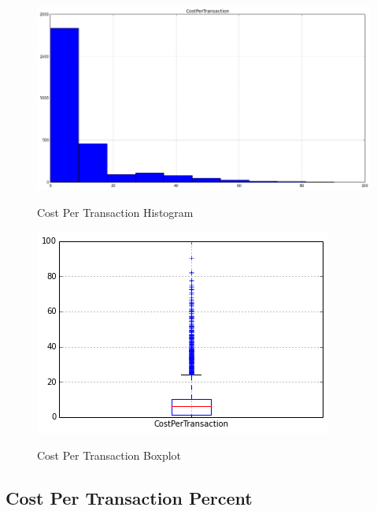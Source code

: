 \begin{figure}[bth]
  \myfloatalign
  {\includegraphics[width=1\linewidth]
    {gfx/cost-per-transaction-histogram}}
  \caption{Cost Per Transaction Histogram}
  \label{fig:cost-per-transaction-histogram}
\end{figure}

\begin{figure}[bth]
  \myfloatalign
  {\includegraphics[width=1\linewidth]
    {gfx/cost-per-transaction-boxplot}}
  \caption{Cost Per Transaction Boxplot}
  \label{fig:cost-per-transaction-boxplot}
\end{figure}

\clearpage

\subsection{Cost Per Transaction Percent}
\label{sec:cost-per-transaction-percent}

